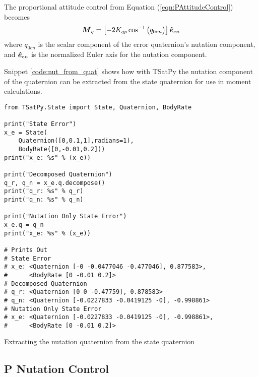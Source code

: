 The proportional attitude control from Equation (\ref{eqn:PAttitudeControl}) becomes
\begin{equation}
  \boldsymbol{M}_{q} = \left[-2 K_{qp} \cos^{-1} \big(q_{0en} \big) \right] \boldsymbol{\hat{e}}_{en} \\
\end{equation}
where $q_{0en}$ is the scalar component of the error quaternion's nutation component, and $\boldsymbol{\hat{e}}_{en}$ is the normalized Euler axis for the nutation component.

Snippet \ref{code:nut_from_quat} shows how with TSatPy the nutation component of the quaternion can be extracted from the state quaternion for use in moment calculations.

\begin{listing}[H]
\begin{singlespace}
  \begin{verbatim}
from TSatPy.State import State, Quaternion, BodyRate

print("State Error")
x_e = State(
    Quaternion([0,0.1,1],radians=1),
    BodyRate([0,-0.01,0.2]))
print("x_e: %s" % (x_e))

print("Decomposed Quaternion")
q_r, q_n = x_e.q.decompose()
print("q_r: %s" % q_r)
print("q_n: %s" % q_n)

print("Nutation Only State Error")
x_e.q = q_n
print("x_e: %s" % (x_e))

# Prints Out
# State Error
# x_e: <Quaternion [-0 -0.0477046 -0.477046], 0.877583>,
#      <BodyRate [0 -0.01 0.2]>
# Decomposed Quaternion
# q_r: <Quaternion [0 0 -0.47759], 0.878583>
# q_n: <Quaternion [-0.0227833 -0.0419125 -0], -0.998861>
# Nutation Only State Error
# x_e: <Quaternion [-0.0227833 -0.0419125 -0], -0.998861>,
#      <BodyRate [0 -0.01 0.2]>
  \end{verbatim}
\caption{Extracting the nutation quaternion from the state quaternion}
\label{code:nut_from_quat}
\nocite{minted}
\end{singlespace}
\end{listing}

\subsection{P Nutation Control}
\label{subsec:PNutationControl}

